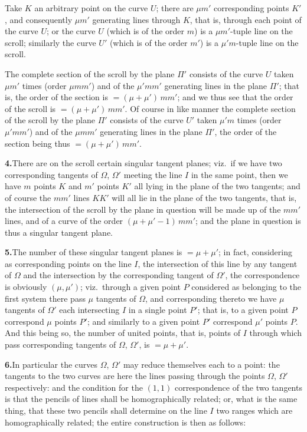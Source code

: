 \documentclass[11pt,a4paper]{article}
\begin{document}
Take $K$ an arbitrary point on the curve $U$; there are $\mu m'$ corresponding
points $K'$, and consequently $\mu m'$ generating lines through $K$, that is,
through each point of the curve $U$; or the curve $U$ (which is of the order
$m$) is a $\mu m'$-tuple line on the scroll; similarly the curve $U'$ (which is
of the order $m'$) is a $\mu' m$-tuple line on the scroll.

The complete section of the scroll by the plane $\Pi'$ consists of the curve
$U$ taken $\mu m'$ times (order $\mu m m'$) and of the $\mu' m m'$ generating
lines in the plane $\Pi'$; that is, the order of the section is
$= (\mu + \mu')\,m m'$; and we thus see that the order of the scroll is
$= (\mu + \mu')\,m m'$. Of course in like manner the complete section of the
scroll by the plane $\Pi'$ consists of the curve $U'$ taken $\mu' m$ times
(order $\mu' m m'$) and of the $\mu m m'$ generating lines in the plane $\Pi'$,
the order of the section being thus $= (\mu + \mu')\,m m'$.

\textbf{4.}\quad There are on the scroll certain singular tangent planes; viz.\
if we have two corresponding tangents of $\Omega$, $\Omega'$ meeting the line
$I$ in the same point, then we have $m$ points $K$ and $m'$ points $K'$ all
lying in the plane of the two tangents; and of course the $m m'$ lines $KK'$
will all lie in the plane of the two tangents, that is, the intersection of
the scroll by the plane in question will be made up of the $m m'$ lines, and
of a curve of the order $(\mu + \mu' - 1)\,m m'$; and the plane in question is
thus a singular tangent plane.

\textbf{5.}\quad The number of these singular tangent planes is $= \mu + \mu'$;
in fact, considering as corresponding points on the line $I$, the intersection
of this line by any tangent of $\Omega$ and the intersection by the
corresponding tangent of $\Omega'$, the correspondence is obviously
$(\mu, \mu')$; viz.\ through a given point $P$ considered as belonging to the
first system there pass $\mu$ tangents of $\Omega$, and corresponding thereto
we have $\mu$ tangents of $\Omega'$ each intersecting $I$ in a single point
$P'$; that is, to a given point $P$ correspond $\mu$ points $P'$; and similarly
to a given point $P'$ correspond $\mu'$ points $P$. And this being so, the
number of united points, that is, points of $I$ through which pass corresponding
tangents of $\Omega$, $\Omega'$, is $= \mu + \mu'$.

\textbf{6.}\quad In particular the curves $\Omega$, $\Omega'$ may reduce
themselves each to a point: the tangents to the two curves are here the lines
passing through the points $\Omega$, $\Omega'$ respectively: and the condition
for the $(1,1)$ correspondence of the two tangents is that the pencils of lines
shall be homographically related; or, what is the same thing, that these two
pencils shall determine on the line $I$ two ranges which are homographically
related; the entire construction is then as follows:
\end{document}
